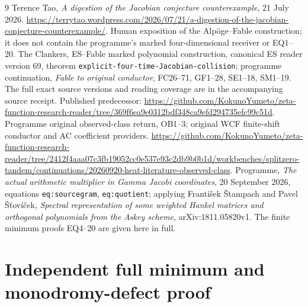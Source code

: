 \begin{thebibliography}{9}
 Terence Tao, \emph{A digestion of the Jacobian conjecture
counterexample}, 21 July 2026.
\url{https://terrytao.wordpress.com/2026/07/21/a-digestion-of-the-jacobian-conjecture-counterexample/}.
Human exposition of the Alp\"oge--Fable construction; it does not
contain the programme's marked four-dimensional receiver or EQ1--20.
 The Clankers, ES--Fable marked polynomial construction,
canonical ES reader version 69, theorem
\texttt{explicit-four-time-Jacobian-collision}; programme continuation,
\emph{Fable to original conductor}, FC26--71, GF1--28, SE1--18,
SM1--19. The full exact source versions and reading coverage are in
the accompanying source receipt. Published predecessor:
\url{https://github.com/KokunoYumeto/zeta-function-research-reader/tree/369f6ea9e0312bdf348ca9efd294735efc99c51d}.
 Programme original observed-class return, OB1--3;
original WCF finite-shift conductor and AC coefficient providers.
\url{https://github.com/KokunoYumeto/zeta-function-research-reader/tree/2412f4aaa07c3fb19052cc0e537e93c2db9b0b1d/workbenches/splitzero-tandem/continuations/20260920-heat-literature-observed-class}.
 Programme, \emph{The actual arithmetic multiplier in
Gamma Jacobi coordinates}, 20 September 2026, equations
\texttt{eq:sourcegram}, \texttt{eq:quotient}; applying
Franti\v{s}ek \v{S}tampach and Pavel \v{S}\v{t}ov\'{i}\v{c}ek,
\emph{Spectral representation of some weighted Hankel matrices and
orthogonal polynomials from the Askey scheme}, arXiv:1811.05820v1.
The finite minimum proofs EQ4--20 are given here in full.
\end{thebibliography}

\endgroup

\clearpage\begingroup
\part*{Independent full minimum and monodromy-defect proof}
\newcommand{\indminC}{\mathbb C}
\newcommand{\indminim}{\operatorname{im}}
\newcommand{\indmindiag}{\operatorname{diag}}
\newcommand{\indminrank}{\operatorname{rank}}
\newcommand{\indminSpan}{\operatorname{span}}
\newcommand{\indminid}{\operatorname{id}}



